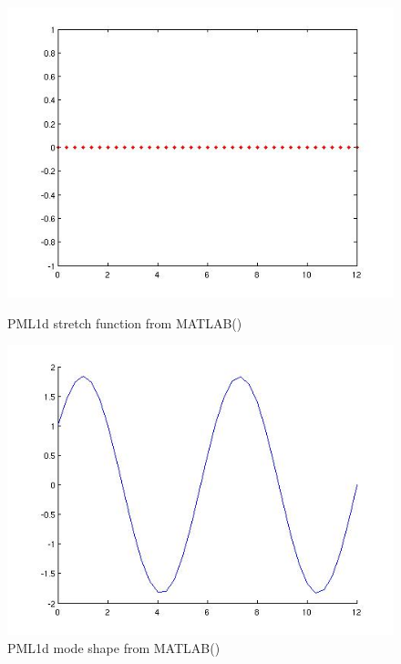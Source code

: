\begin{figure}[htbp]
  \begin{minipage}{0.45\linewidth}
    \includegraphics[width=\linewidth]{fig/pml1d_stretch0_matlab.jpg}
    \caption{PML1d stretch function from MATLAB()}
    \label{fig:PML1dStretchFunction0MATLAB}
  \end{minipage}
  \hfill
  \begin{minipage}{0.45\linewidth}
    \includegraphics[width=\linewidth]{fig/pml1d_mode0_matlab.jpg}
    \caption{PML1d mode shape from MATLAB()}
    \label{fig:PML1dModeShape0MATLAB}
  \end{minipage}
  \begin{minipage}{0.45\linewidth}

\end{minipage}
\end{figure}
